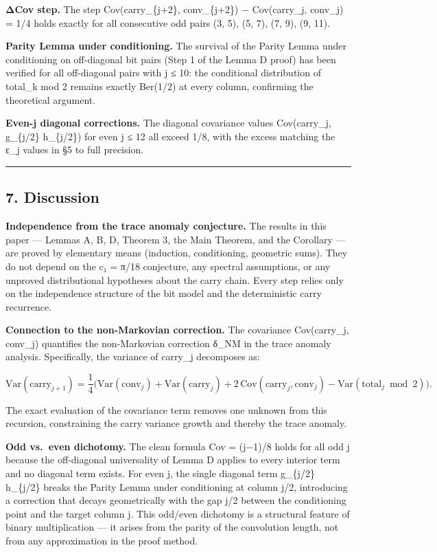 \documentclass[
  11pt,
]{article}
\begin{document}
\textbf{ΔCov step.} The step Cov(carry\_\{j+2\}, conv\_\{j+2\}) − Cov(carry\_j,
conv\_j) = 1/4 holds exactly for all consecutive odd pairs (3, 5), (5, 7), (7,
9), (9, 11).

\textbf{Parity Lemma under conditioning.} The survival of the Parity Lemma under
conditioning on off-diagonal bit pairs (Step 1 of the Lemma D proof) has been
verified for all off-diagonal pairs with j ≤ 10: the conditional distribution of
total\_k mod 2 remains exactly Ber(1/2) at every column, confirming the
theoretical argument.

\textbf{Even-j diagonal corrections.} The diagonal covariance values
Cov(carry\_j, g\_\{j/2\} h\_\{j/2\}) for even j ≤ 12 all exceed 1/8, with the
excess matching the ε\_j values in §5 to full precision.

\begin{center}\rule{0.5\linewidth}{0.5pt}\end{center}

\newpage

\subsection{7. Discussion}\label{discussion}

\textbf{Independence from the trace anomaly conjecture.} The results in this
paper --- Lemmas A, B, D, Theorem 3, the Main Theorem, and the Corollary --- are
proved by elementary means (induction, conditioning, geometric sums). They do
not depend on the c₁ = π/18 conjecture, any spectral assumptions, or any
unproved distributional hypotheses about the carry chain. Every step relies only
on the independence structure of the bit model and the deterministic carry
recurrence.

\textbf{Connection to the non-Markovian correction.} The covariance
Cov(carry\_j, conv\_j) quantifies the non-Markovian correction δ\_NM in the
trace anomaly analysis. Specifically, the variance of carry\_j decomposes as:

\[\text{Var}(\text{carry}_{j+1}) = \frac{1}{4}\bigl(\text{Var}(\text{conv}_j) + \text{Var}(\text{carry}_j) + 2\,\text{Cov}(\text{carry}_j, \text{conv}_j) - \text{Var}(\text{total}_j \bmod 2)\bigr).\]

The exact evaluation of the covariance term removes one unknown from this
recursion, constraining the carry variance growth and thereby the trace anomaly.

\textbf{Odd vs.~even dichotomy.} The clean formula Cov = (j−1)/8 holds for all
odd j because the off-diagonal universality of Lemma D applies to every interior
term and no diagonal term exists. For even j, the single diagonal term
g\_\{j/2\} h\_\{j/2\} breaks the Parity Lemma under conditioning at column j/2,
introducing a correction that decays geometrically with the gap j/2 between the
conditioning point and the target column j. This odd/even dichotomy is a
structural feature of binary multiplication --- it arises from the parity of the
convolution length, not from any approximation in the proof method.
\end{document}
